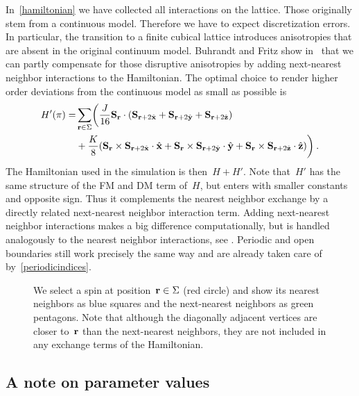 In~\eqref{hamiltonian} we have collected all interactions on the lattice. Those
originally stem from a continuous model. Therefore we have to expect
discretization errors.  In particular, the transition to a finite cubical
lattice introduces anisotropies that are absent in the original continuum model.
Buhrandt and Fritz show in~\cite{skyrmionlattice} that we can partly compensate
for those disruptive anisotropies by adding next-nearest neighbor interactions
to the Hamiltonian. The optimal choice to render higher order deviations from
the continuous model as small as possible is
%
\begin{align}\label{hamiltonianfix}
  H'(\pi) = & \sum_{\mathbf{r} \in \Sigma} \biggl(
  \frac{J}{16} \mathbf{S}_{\mathbf{r}} \cdot (\mathbf{S}_{\mathbf{r}+2\hat{\mathbf{x}}} + \mathbf{S}_{\mathbf{r}+2\hat{\mathbf{y}}} + \mathbf{S}_{\mathbf{r}+2\hat{\mathbf{z}}})\nonumber \\
  &+ \frac{K}{8} (\mathbf{S}_{\mathbf{r}} \times \mathbf{S}_{\mathbf{r}+2\hat{\mathbf{x}}} \cdot \hat{\mathbf{x}} +
        \mathbf{S}_{\mathbf{r}} \times \mathbf{S}_{\mathbf{r}+2\hat{\mathbf{y}}} \cdot \hat{\mathbf{y}} +
        \mathbf{S}_{\mathbf{r}} \times \mathbf{S}_{\mathbf{r}+2\hat{\mathbf{z}}} \cdot \hat{\mathbf{z}})\biggr)\:.
\end{align}
%
The Hamiltonian used in the simulation is then~$H + H'$. Note that~$H'$ has the
same structure of the FM and DM term of~$H$, but enters with smaller constants
and opposite sign. Thus it complements the nearest neighbor exchange by a
directly related next-nearest neighbor interaction term. Adding next-nearest
neighbor interactions makes a big difference computationally, but is handled
analogously to the nearest neighbor interactions, see .
Periodic and open boundaries still work precisely the same way and are already
taken care of by~\eqref{periodicindices}.

\begin{figure}
  \centering
  \caption{We select a spin at position~$\mathbf{r} \in \Sigma$ (red circle) and show
  its nearest neighbors as blue squares and the next-nearest neighbors as green
  pentagons.  Note that although the diagonally adjacent vertices are closer
  to~$\mathbf{r}$ than the next-nearest neighbors, they are not included in any
  exchange terms of the Hamiltonian.}
\label{fig:interact}
\end{figure}

\subsection{A note on parameter values}

